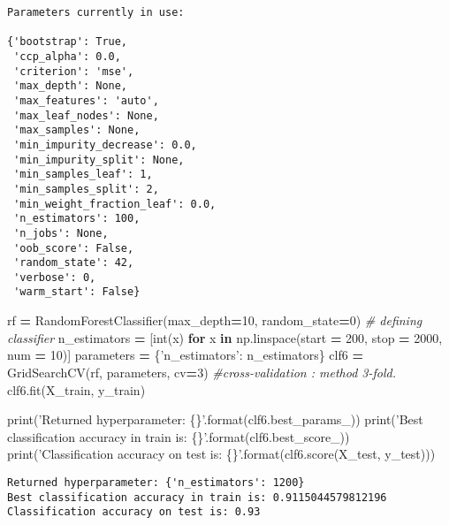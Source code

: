 \documentclass[10pt,a4paper]{article}
\newenvironment{Shaded}{\begin{snugshade}}{\end{snugshade}}
\newcommand{\BuiltInTok}[1]{#1}
\newcommand{\CommentTok}[1]{\textcolor[rgb]{0.56,0.35,0.01}{\textit{#1}}}
\newcommand{\ControlFlowTok}[1]{\textcolor[rgb]{0.13,0.29,0.53}{\textbf{#1}}}
\newcommand{\DecValTok}[1]{\textcolor[rgb]{0.00,0.00,0.81}{#1}}
\newcommand{\KeywordTok}[1]{\textcolor[rgb]{0.13,0.29,0.53}{\textbf{#1}}}
\newcommand{\NormalTok}[1]{#1}
\newcommand{\OperatorTok}[1]{\textcolor[rgb]{0.81,0.36,0.00}{\textbf{#1}}}
\newcommand{\SpecialCharTok}[1]{\textcolor[rgb]{0.00,0.00,0.00}{#1}}
\newcommand{\StringTok}[1]{\textcolor[rgb]{0.31,0.60,0.02}{#1}}
\theoremstyle{break}
\begin{document}
\begin{verbatim}
Parameters currently in use:

{'bootstrap': True,
 'ccp_alpha': 0.0,
 'criterion': 'mse',
 'max_depth': None,
 'max_features': 'auto',
 'max_leaf_nodes': None,
 'max_samples': None,
 'min_impurity_decrease': 0.0,
 'min_impurity_split': None,
 'min_samples_leaf': 1,
 'min_samples_split': 2,
 'min_weight_fraction_leaf': 0.0,
 'n_estimators': 100,
 'n_jobs': None,
 'oob_score': False,
 'random_state': 42,
 'verbose': 0,
 'warm_start': False}
\end{verbatim}

\begin{Shaded}
\begin{Highlighting}[]
\NormalTok{rf }\OperatorTok{=}\NormalTok{ RandomForestClassifier(max_depth}\OperatorTok{=}\DecValTok{10}\NormalTok{, random_state}\OperatorTok{=}\DecValTok{0}\NormalTok{) }\CommentTok{# defining classifier}
\NormalTok{n_estimators }\OperatorTok{=}\NormalTok{ [}\BuiltInTok{int}\NormalTok{(x) }\ControlFlowTok{for}\NormalTok{ x }\KeywordTok{in}\NormalTok{ np.linspace(start }\OperatorTok{=} \DecValTok{200}\NormalTok{, stop }\OperatorTok{=} \DecValTok{2000}\NormalTok{, num }\OperatorTok{=} \DecValTok{10}\NormalTok{)]}
\NormalTok{parameters }\OperatorTok{=}\NormalTok{ \{}\StringTok{'n_estimators'}\NormalTok{: n_estimators\}}
\NormalTok{clf6 }\OperatorTok{=}\NormalTok{ GridSearchCV(rf, parameters, cv}\OperatorTok{=}\DecValTok{3}\NormalTok{) }\CommentTok{#cross-validation : method 3-fold.}
\NormalTok{clf6.fit(X_train, y_train)}

\BuiltInTok{print}\NormalTok{(}\StringTok{'Returned hyperparameter: }\SpecialCharTok{\{\}}\StringTok{'}\NormalTok{.}\BuiltInTok{format}\NormalTok{(clf6.best_params_))}
\BuiltInTok{print}\NormalTok{(}\StringTok{'Best classification accuracy in train is: }\SpecialCharTok{\{\}}\StringTok{'}\NormalTok{.}\BuiltInTok{format}\NormalTok{(clf6.best_score_))}
\BuiltInTok{print}\NormalTok{(}\StringTok{'Classification accuracy on test is: }\SpecialCharTok{\{\}}\StringTok{'}\NormalTok{.}\BuiltInTok{format}\NormalTok{(clf6.score(X_test, y_test)))}
\end{Highlighting}
\end{Shaded}

\begin{verbatim}
Returned hyperparameter: {'n_estimators': 1200}
Best classification accuracy in train is: 0.9115044579812196
Classification accuracy on test is: 0.93
\end{verbatim}
\end{document}
